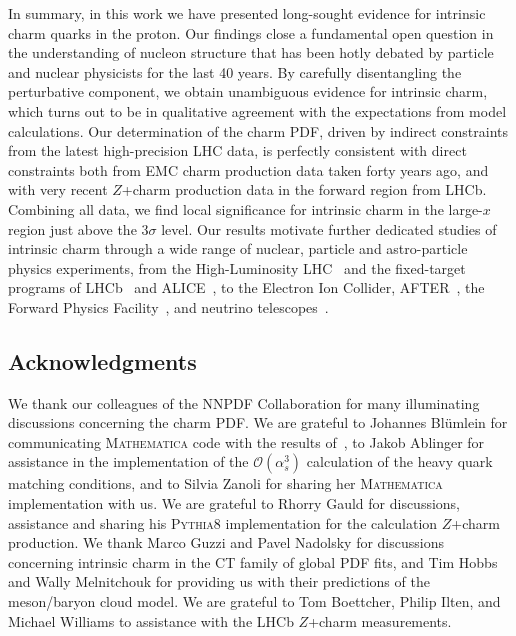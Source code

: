 In summary, in this work we have presented
long-sought evidence for intrinsic charm quarks in the proton.
%
Our findings
close a fundamental open question
in the understanding of nucleon structure that has been hotly
debated by  particle and nuclear physicists for the last 40 years.
%
By carefully disentangling the perturbative component,
we obtain unambiguous evidence for intrinsic charm, 
which turns out to be in qualitative agreement with
the expectations from model calculations.
%
Our determination of the charm PDF, driven by indirect constraints from the 
latest high-precision LHC data, is perfectly
consistent with direct constraints both from EMC charm production
data taken forty years  
ago, and with very recent  $Z$+charm production data in the
forward region from LHCb.
%
Combining all data, we find
local significance for intrinsic charm in the large-$x$
region just above the  $3\sigma$ level.
%
Our results motivate
further dedicated studies of intrinsic charm through a wide range
of nuclear, particle and astro-particle physics experiments,
from the High-Luminosity LHC~\cite{Azzi:2019yne}
and the fixed-target programs of LHCb~\cite{LHCb:2018jry} and
ALICE~\cite{QCDWorkingGroup:2019dyv}, to
the  
Electron Ion Collider, AFTER~\cite{Hadjidakis:2018ifr},
the Forward Physics Facility~\cite{Anchordoqui:2021ghd},
and neutrino telescopes~\cite{Halzen:2016thi}.


\subsection*{Acknowledgments}

We thank our colleagues of the NNPDF Collaboration
for many illuminating discussions concerning the charm PDF.
%
We are grateful to Johannes Bl\"umlein for communicating  \textsc{\small Mathematica}
code with the results
of~\cite{Bierenbaum:2009zt,Bierenbaum:2009mv,Ablinger:2010ty,Ablinger:2014vwa,Ablinger:2014uka,Behring:2014eya,Ablinger_2014,Ablinger:2014nga,Blumlein:2017wxd}, to
Jakob Ablinger for assistance
in the implementation of the $\mathcal{O}\left( \alpha_s^3 \right)$ calculation
of the heavy quark matching conditions, and to Silvia Zanoli
for sharing her \textsc{\small Mathematica} implementation with us.
%
%
We are grateful to Rhorry Gauld for discussions, assistance and sharing his \textsc{\small Pythia8} 
implementation for the calculation $Z$+charm production.
%
We thank Marco Guzzi and Pavel Nadolsky for discussions concerning intrinsic charm
in the CT family of global PDF fits, and Tim Hobbs and Wally Melnitchouk for providing
us with their predictions of the meson/baryon cloud model.
%
We are grateful to Tom Boettcher, Philip Ilten, and Michael Williams to assistance
with the LHCb $Z$+charm measurements.

